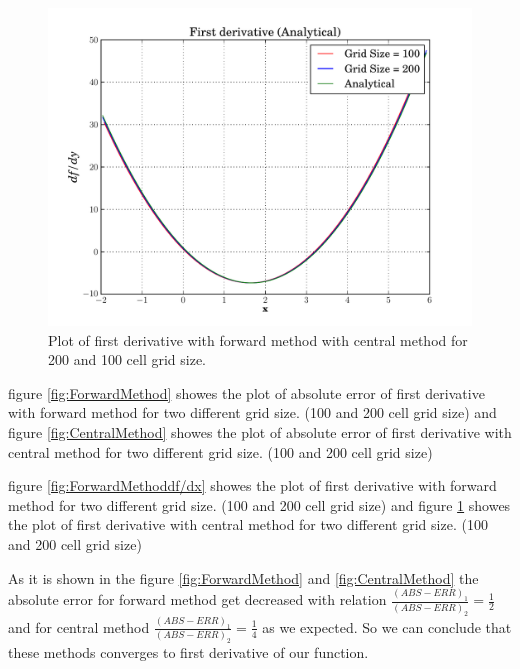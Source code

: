 \documentclass[10pt]{article}
\begin{document}
\begin{figure}[h]
  \begin{center}
    \includegraphics[totalheight=0.5\textheight]{plot4.pdf}
    \caption{\label{fig:CentralMethoddf/dx} Plot of first derivative with forward method with central method for 200 and 100 cell grid size.}
  \end{center}
\end{figure}

figure \ref{fig:ForwardMethod} showes the plot of absolute error of first derivative with forward method for two different grid size. (100 and 200 cell grid size) and figure \ref{fig:CentralMethod} showes the plot of absolute error of first derivative with central method for two different grid size. (100 and 200 cell grid size)


figure \ref{fig:ForwardMethoddf/dx} showes the plot of first derivative
 with forward method for two different grid size. (100 and 200 cell grid size) and figure \ref{fig:CentralMethoddf/dx} showes the plot of first derivative
with central method for two different grid size. (100 and 200 cell grid size)


As it is shown in the figure \ref{fig:ForwardMethod} and \ref{fig:CentralMethod} the absolute error for forward method get decreased with relation $\frac{(ABS-ERR)_1}{(ABS-ERR)_2} = \frac{1}{2}$ and for central method $\frac{(ABS-ERR)_1}{(ABS-ERR)_2} = \frac{1}{4}$  as we expected. So we can conclude that these methods converges to first derivative of our function.\\
\end{document}
